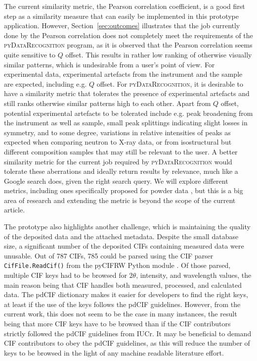 \documentclass[preprint]{iucr}
\newcommand{\sect}[1]{Section~\ref{sec:#1}}
\newcommand{\pydr}{\textsc{pyDataRecognition}\xspace}
\begin{document}
The current similarity metric, the Pearson correlation coefficient, is a good first step as a similarity measure that can easily be implemented in this prototype application. However, \sect{outcomes} illustrates that the job currently done by the Pearson correlation does not completely meet the requirements of the \pydr program, as it is observed that the Pearson correlation seems quite sensitive to $Q$ offset. This results in rather low ranking of otherwise visually similar patterns, which is undesirable from a user's point of view.
For experimental data, experimental artefacts from the instrument and the sample are expected, including e.g. $Q$ offset. For \pydr, it is desirable to have a similarity metric that tolerates the presence of experimental artefacts and still ranks otherwise similar patterns high to each other.
Apart from $Q$ offset, potential experimental artefacts to be tolerated include e.g. peak broadening from the instrument as well as sample, small peak splittings indicating slight losses in symmetry, and to some degree, variations in relative intensities of peaks as expected when comparing neutron to X-ray data, or from isostructural but different composition samples that may still be relevant to the user.
A better similarity metric for the current job required by \pydr would tolerate these aberrations and ideally return results by relevance, much like a Google search does, given the right search query.  We will explore different metrics, including ones specifically proposed for powder data 
\cite{degelderGeneralizedExpressionSimilarity2001}, but this is a big area of research \cite{vombrockeStandingShouldersGiants2015} and extending the metric is beyond the scope of the current article.

The prototype also highlights another challenge, which is maintaining the quality of the deposited data and the attached metadata.
Despite the small database size, a significant number of the deposited CIFs containing measured data were unusable.
Out of 787 CIFs, 785 could be parsed using the CIF parser \texttt{CifFile.ReadCif()} from the pyCIFRW Python module \cite{hesterValidatingCIFParser2006}.
Of those parsed, multiple CIF keys had to be browsed for $2\theta$, intensity, and wavelength values, the main reason being that CIF handles both measured, processed, and calculated data. The pdCIF dictionary makes it easier for developers to find the right keys, at least if the use of the keys follows the pdCIF guidelines. \cite{tobyPowderDictionaryPdCIF2006} However, from the current work, this does not seem to be the case in many instances, the result being that more CIF keys have to be browsed than if the CIF contributors strictly followed the pdCIF guidelines from IUCr. It may be beneficial to demand CIF contributors to obey the pdCIF guidelines, as this will reduce the number of keys to be browsed in the light of any machine readable literature effort.
\end{document}
